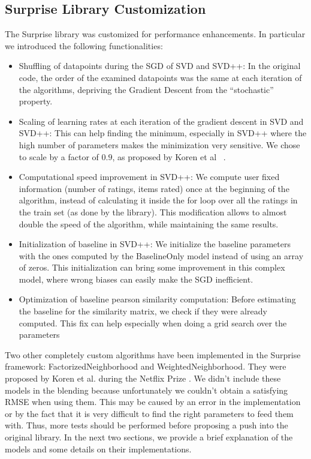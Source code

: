 \documentclass[10pt,conference,compsocconf]{IEEEtran}
\begin{document}
\subsection{Surprise Library Customization}
The Surprise library was customized for performance enhancements. In particular we introduced the following functionalities:
\begin{itemize}
\item Shuffling of datapoints during the SGD of SVD and SVD++: In the original code, the order of the examined datapoints was the same at each iteration of the algorithms, depriving the Gradient Descent from the ``stochastic'' property.
\item Scaling of learning rates at each iteration of the gradient descent in SVD and SVD++: This can help finding the minimum, especially in SVD++ where the high number of parameters makes the minimization very sensitive. We chose to scale by a factor of $0.9$, as proposed by Koren et al ~\cite{koren2009bellkor}.
\item Computational speed improvement in SVD++: We compute user fixed information (number of ratings, items rated) once at the beginning of the algorithm, instead of calculating it inside the for loop over all the ratings in the train set (as done by the library). This modification allows to almost double the speed of the algorithm, while maintaining the same results.
\item Initialization of baseline in SVD++: We initialize the baseline parameters with the ones computed by the BaselineOnly model instead of using an array of zeros. This initialization can bring some improvement in this complex model, where wrong biases can easily make the SGD inefficient.
\item Optimization of baseline pearson similarity computation: Before estimating the baseline for the similarity matrix, we check if they were already computed. This fix can help especially when doing a grid search over the parameters
\end{itemize}
Two other completely custom algorithms have been implemented in the Surprise framework: FactorizedNeighborhood and WeightedNeighborhood. They were proposed by Koren et al. during the Netflix Prize \cite{koren2008factorization, koren2010factor}. We didn't include these models in the blending because unfortunately we couldn't obtain a satisfying RMSE when using them. This may be caused by an error in the implementation or by the fact that it is very difficult to find the right parameters to feed them with. Thus, more tests should be performed before proposing a push into the original library. In the next two sections, we provide a brief explanation of the models and some details on their implementations.
\end{document}
